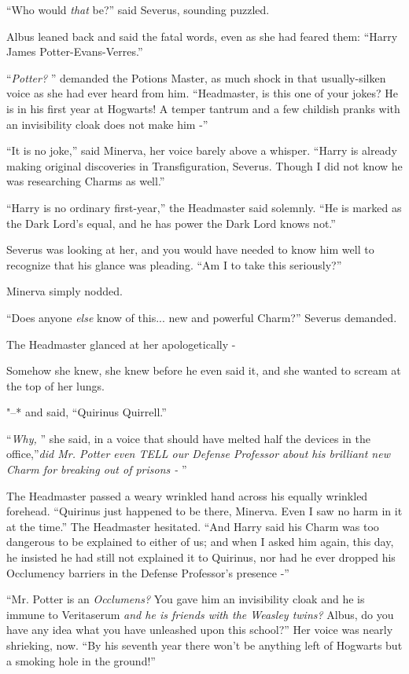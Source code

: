 ``Who would \emph{that} be?'' said Severus, sounding puzzled.

Albus leaned back and said the fatal words, even as she had feared them:
``Harry James Potter-Evans-Verres.''

``\emph{Potter?} '' demanded the Potions Master, as much shock in that
usually-silken voice as she had ever heard from him. ``Headmaster, is
this one of your jokes? He is in his first year at Hogwarts! A temper
tantrum and a few childish pranks with an invisibility cloak does not
make him -''

``It is no joke,'' said Minerva, her voice barely above a whisper.
``Harry is already making original discoveries in Transfiguration,
Severus. Though I did not know he was researching Charms as well.''

``Harry is no ordinary first-year,'' the Headmaster said solemnly. ``He
is marked as the Dark Lord's equal, and he has power the Dark Lord knows
not.''

Severus was looking at her, and you would have needed to know him well
to recognize that his glance was pleading. ``Am I to take this
seriously?''

Minerva simply nodded.

``Does anyone \emph{else} know of this... new and powerful Charm?''
Severus demanded.

The Headmaster glanced at her apologetically -

Somehow she knew, she knew before he even said it, and she wanted to
scream at the top of her lungs.

"--* and said, ``Quirinus Quirrell.''

``\emph{Why,} '' she said, in a voice that should have melted half the
devices in the office,''\emph{did Mr. Potter even TELL our Defense
Professor about his brilliant new Charm for breaking out of prisons -} ''

The Headmaster passed a weary wrinkled hand across his equally wrinkled
forehead. ``Quirinus just happened to be there, Minerva. Even I saw no
harm in it at the time.'' The Headmaster hesitated. ``And Harry said his
Charm was too dangerous to be explained to either of us; and when I
asked him again, this day, he insisted he had still not explained it to
Quirinus, nor had he ever dropped his Occlumency barriers in the Defense
Professor's presence -''

``Mr. Potter is an \emph{Occlumens?} You gave him an invisibility cloak
and he is immune to Veritaserum \emph{and he is friends with the Weasley
twins?} Albus, do you have any idea what you have unleashed upon this
school?'' Her voice was nearly shrieking, now. ``By his seventh year
there won't be anything left of Hogwarts but a smoking hole in the
ground!''

